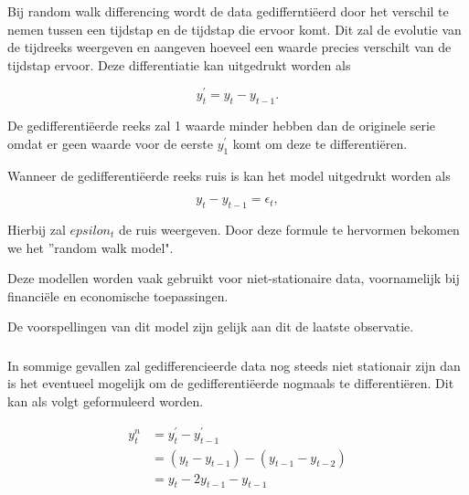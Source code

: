 \subsubsection{}
Bij random walk differencing wordt de data gediffernti\"{e}erd door het verschil te nemen tussen een tijdstap en de tijdstap die ervoor komt. Dit zal de evolutie van de tijdreeks weergeven en aangeven hoeveel een waarde precies verschilt van de tijdstap ervoor. Deze differentiatie kan uitgedrukt worden als

\begin{equation}
y_t^\prime = y_t - y_{t-1}.
\end{equation}

De gedifferenti\"{e}erde reeks zal 1 waarde minder hebben dan de originele serie omdat er geen waarde voor de eerste $y_1^\prime$ komt om deze te differenti\"{e}ren.
 
Wanneer de gedifferentiëerde reeks ruis is kan het model uitgedrukt worden als 
 
\begin{equation}
y_t - y_{t-1} = \epsilon_t,
\end{equation}

Hierbij zal $epsilon_t$ de ruis weergeven. Door deze formule te hervormen bekomen we het ''random walk model".

Deze modellen worden vaak gebruikt voor niet-stationaire data, voornamelijk bij financi\"{e}le en economische toepassingen.

De voorspellingen van dit model zijn gelijk aan dit de laatste observatie.

\subsubsection{}

In sommige gevallen zal gedifferencieerde data nog steeds niet stationair zijn dan is het eventueel mogelijk om de gedifferenti\"{e}erde nogmaals te differenti\"{e}ren. Dit kan als volgt geformuleerd worden.

\begin{equation}
\begin{aligned}
y_t^n {} & = y^\prime_t - y^\prime_{t-1}  \\
& = (y_t - y_{t-1}) - (y_{t-1} - y_{t-2})\\
& = y_t - 2y_{t-1} - y_{t-1}
\end{aligned}
\end{equation}

